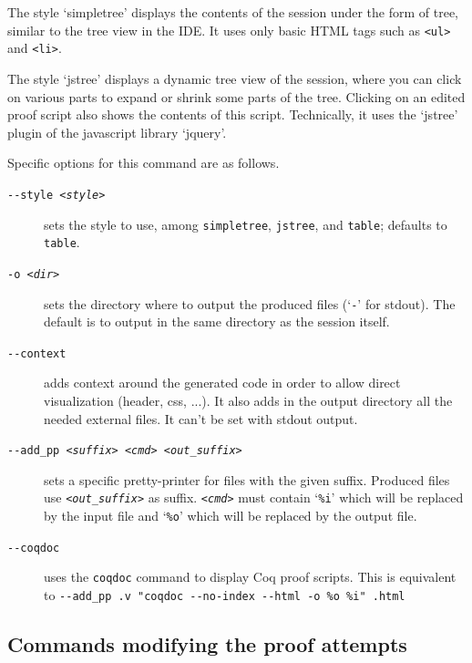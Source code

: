 The style `simpletree' displays the contents of the session under the
form of tree, similar to the tree view in the IDE. It uses only basic
HTML tags such as \verb|<ul>| and \verb|<li>|.

The style `jstree' displays a dynamic tree view of the session, where
you can click on various parts to expand or shrink some parts of the
tree. Clicking on an edited proof script also shows the contents of
this script. Technically, it uses the `jstree' plugin of the javascript
library `jquery'.

Specific options for this command are as follows.
\begin{description}
\item[\texttt{-{}-style \textsl{<style>}}] sets the style to use, among
  \texttt{simpletree}, \texttt{jstree}, and \texttt{table}; defaults to
  \texttt{table}.

\item[\texttt{-o \textsl{<dir>}}] sets the directory where to output
  the produced files (`\texttt{-}' for stdout). The default is to output
  in the same directory as the session itself.

\item[\texttt{-{}-context}] adds context around the generated code in
  order to allow direct visualization (header, css, ...). It also adds
  in the output directory all the needed external files. It can't be set with
  stdout output.

\item[\texttt{-{}-add\_pp \textsl{<suffix>} \textsl{<cmd>} \textsl{<out\_suffix>}}] sets a specific
  pretty-printer for files with the given suffix. Produced files use
  \texttt{\textsl{<out\_suffix>}} as suffix. \texttt{\textsl{<cmd>}} must contain
  `\texttt{\%i}' which will be replaced by the input file and
  `\texttt{\%o}' which will be replaced by the output file.

\item[\texttt{-{}-coqdoc}] uses the \verb|coqdoc| command to display Coq proof
  scripts. This is equivalent to \texttt{-{}-add\_pp .v "coqdoc
    -{}-no-index -{}-html -o \%o \%i" .html}

\end{description}

\subsection{Commands modifying the proof attempts}

